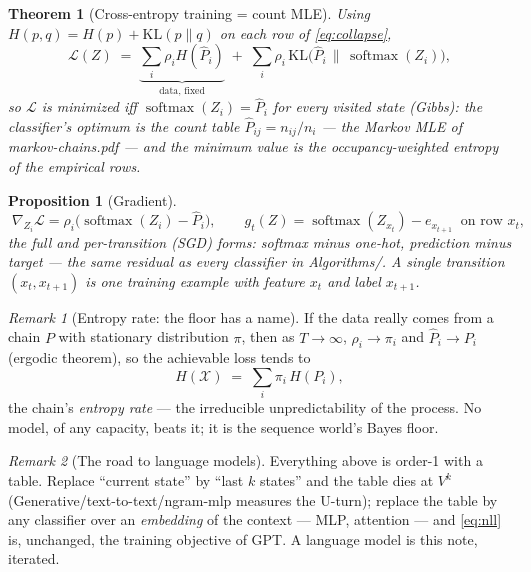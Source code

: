 \documentclass[11pt]{article}
\newtheorem{theorem}{Theorem}
\newtheorem{proposition}{Proposition}
\theoremstyle{remark}
\newtheorem{remark}{Remark}
\newcommand{\smax}{\operatorname{softmax}}
\begin{document}
\begin{theorem}[Cross-entropy training = count MLE]
\label{thm:main}
Using $H(p, q) = H(p) + \mathrm{KL}(p \| q)$ on each row of
\eqref{eq:collapse},
\begin{equation}
  \mathcal{L}(Z)
  \;=\; \underbrace{\sum_i \rho_i H(\hat P_i)}_{\text{data, fixed}}
  \;+\; \sum_i \rho_i\,
  \mathrm{KL}\bigl(\hat P_i \,\|\, \smax(Z_i)\bigr),
  \label{eq:decomp}
\end{equation}
so $\mathcal{L}$ is minimized iff $\smax(Z_i) = \hat P_i$ for every
visited state (Gibbs): \emph{the classifier's optimum is the count
table} $\hat P_{ij} = n_{ij}/n_i$ --- the Markov MLE of
markov-chains.pdf --- and the minimum value is the occupancy-weighted
entropy of the empirical rows.
\end{theorem}

\begin{proposition}[Gradient]
\begin{equation}
  \boxed{\;\nabla_{Z_i} \mathcal{L}
  = \rho_i\bigl(\smax(Z_i) - \hat P_i\bigr),
  \qquad
  g_t(Z) = \smax(Z_{x_t}) - e_{x_{t+1}} \ \text{ on row } x_t,\;}
  \label{eq:grad}
\end{equation}
the full and per-transition (SGD) forms: softmax minus one-hot,
prediction minus target --- the same residual as every classifier in
Algorithms/. A single transition $(x_t, x_{t+1})$ is one training
example with feature $x_t$ and label $x_{t+1}$.
\end{proposition}

\begin{remark}[Entropy rate: the floor has a name]
If the data really comes from a chain $P$ with stationary
distribution $\pi$, then as $T \to \infty$, $\rho_i \to \pi_i$ and
$\hat P_i \to P_i$ (ergodic theorem), so the achievable loss tends to
\begin{equation}
  H(\mathcal{X}) \;=\; \sum_i \pi_i \, H(P_i),
  \label{eq:entropyrate}
\end{equation}
the chain's \emph{entropy rate} --- the irreducible unpredictability
of the process. No model, of any capacity, beats it; it is the
sequence world's Bayes floor.
\end{remark}

\begin{remark}[The road to language models]
Everything above is order-1 with a table. Replace ``current state''
by ``last $k$ states'' and the table dies at $V^k$
(Generative/text-to-text/ngram-mlp measures the U-turn); replace the
table by any classifier over an \emph{embedding} of the context ---
MLP, attention --- and \eqref{eq:nll} is, unchanged, the training
objective of GPT. A language model is this note, iterated.
\end{remark}
\end{document}
